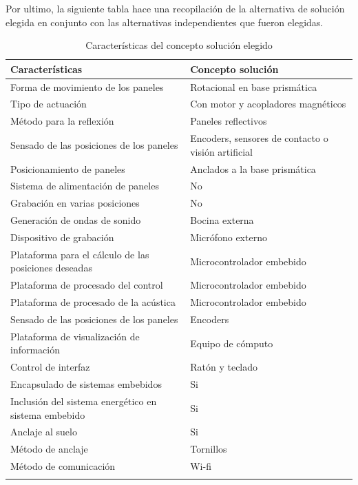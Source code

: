 \FloatBarrier
Por ultimo, la siguiente tabla hace una recopilación de la alternativa de solución elegida en conjunto con las alternativas independientes que fueron elegidas. 
\begin{center}
\footnotesize
\centering
    \begin{longtable}[!htbp]{|>{\centering\arraybackslash}m{20em} |>{\centering\arraybackslash}m{20em} |}
    \hline
    \textbf{Características} & \textbf{Concepto solución}\\
    \hline\hline
    Forma de movimiento de los paneles & Rotacional en base prismática \\
    \hline
    Tipo de actuación & Con motor y acopladores magnéticos \\
    \hline
    Método para la reflexión & Paneles reflectivos  \\
    \hline
    Sensado de las posiciones de los paneles & Encoders, sensores de contacto o visión artificial  \\
    \hline
    Posicionamiento de paneles & Anclados a la base prismática \\
    \hline
    Sistema de alimentación de paneles & No \\
    \hline
    Grabación en varias posiciones & No \\
    \hline
    Generación de ondas de sonido & Bocina externa \\
    \hline
    Dispositivo de grabación & Micrófono externo \\
    \hline
    Plataforma para el cálculo de las posiciones deseadas & Microcontrolador embebido \\
    \hline
    Plataforma de procesado del control &  Microcontrolador embebido\\
    \hline
    Plataforma de procesado de la acústica & Microcontrolador embebido \\
    \hline
    Sensado de las posiciones de los paneles & Encoders \\
    \hline
    Plataforma de visualización de información &  Equipo de cómputo\\
    \hline
    Control de interfaz & Ratón y teclado \\
    \hline
    Encapsulado de sistemas embebidos &  Si\\
    \hline
    Inclusión del sistema energético en sistema embebido & Si \\
    \hline
    Anclaje al suelo & Si \\
    \hline
    Método de anclaje &  Tornillos \\
    \hline
    Método de comunicación & Wi-fi \\
    \hline    
    \caption{Características del concepto solución elegido}
    \label{tab:ConceptoElegido}
    \end{longtable}
\end{center}
\FloatBarrier

